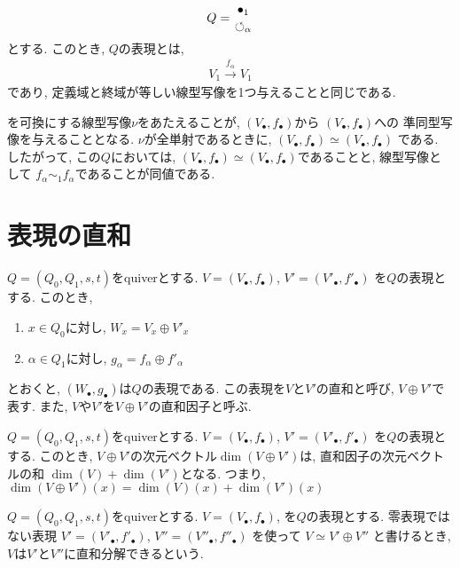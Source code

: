 \begin{example}
  \begin{align*}
    Q=\genfrac{}{}{0pt}{}{\bullet_{1}}{\circlearrowleft_{\alpha}}
  \end{align*}
  とする.
  このとき, $Q$の表現とは,
  \begin{align*}
    V_1 \xrightarrow{f_\alpha} V_{1}
  \end{align*}
  であり,
  定義域と終域が等しい線型写像を1つ与えることと同じである.
  \begin{center}
  \end{center}
  を可換にする線型写像$\nu$をあたえることが,
  $(V_\bullet,f_\bullet)$から
  $(V_\bullet,f_\bullet)$への
  準同型写像を与えることとなる.
  $\nu$が全単射であるときに,
  $(V_\bullet,f_\bullet)\simeq (V_\bullet,f_\bullet)$
  である.
  したがって, この$Q$においては,
  $(V_\bullet,f_\bullet)\simeq (V_\bullet,f_\bullet)$であることと,
  線型写像として
  $f_\alpha \sim_1 f_\alpha$であることが同値である.  
\end{example}

\section{表現の直和}

\begin{definition}
  $Q=(Q_0,Q_1,s,t)$をquiverとする.
  $V=(V_\bullet,f_\bullet)$,
  $V'=(V'_\bullet,f'_\bullet)$
  を$Q$の表現とする.
  このとき,
  \begin{enumerate}
  \item $x\in Q_0$に対し, $W_x=V_x\oplus V'_x$
  \item $\alpha\in Q_1$に対し, $g_\alpha=f_\alpha\oplus f'_\alpha$
  \end{enumerate}
  とおくと, $(W_\bullet,g_\bullet)$は$Q$の表現である.
  この表現を$V$と$V'$の直和と呼び, $V\oplus V'$で表す.
  また, $V$や$V'$を$V\oplus V'$の直和因子と呼ぶ.
\end{definition}
\begin{remark}
  $Q=(Q_0,Q_1,s,t)$をquiverとする.
  $V=(V_\bullet,f_\bullet)$,
  $V'=(V'_\bullet,f'_\bullet)$
  を$Q$の表現とする.
  このとき, $V\oplus V'$の次元ベクトル$\dim(V\oplus V')$は,
  直和因子の次元ベクトルの和
  $\dim(V)+\dim(V')$となる.
  つまり,
  $\dim(V\oplus V')(x)=\dim(V)(x)+\dim(V')(x)$
\end{remark}
\begin{definition}
  $Q=(Q_0,Q_1,s,t)$をquiverとする.
  $V=(V_\bullet,f_\bullet)$,
  を$Q$の表現とする.
  零表現ではない表現
  $V'=(V'_\bullet,f'_\bullet)$,
  $V''=(V''_\bullet,f''_\bullet)$
  を使って
  $V\simeq V'\oplus V''$
  と書けるとき,
  $V$は$V'$と$V''$に直和分解できるという.
\end{definition}

